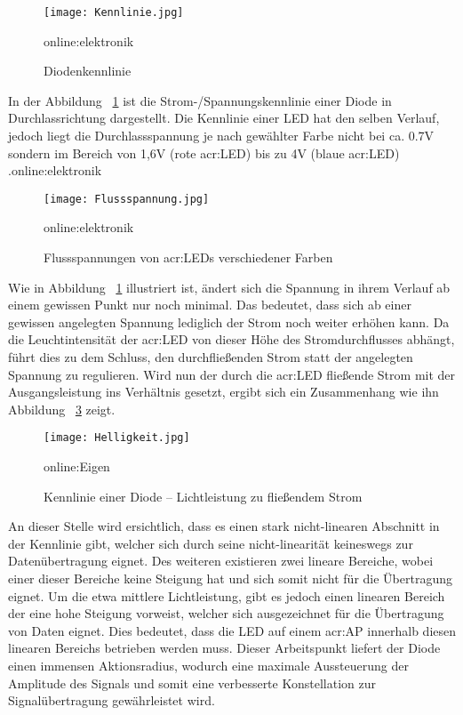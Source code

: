 \begin{figure}[H]
	\centering
	\texttt{[image: Kennlinie.jpg]}
	\caption[Diodenkennlinie]{Diodenkennlinie} 
	\gls{online:elektronik}
	\label{fig:Kennlinie}
\end{figure}

In der Abbildung ~\ref{fig:Kennlinie} ist die Strom-/Spannungskennlinie einer Diode in Durchlassrichtung
dargestellt. Die Kennlinie einer LED hat den selben Verlauf, jedoch liegt die Durchlassspannung je nach gewählter Farbe nicht bei ca. 0.7V sondern im Bereich von 1,6V (rote \gls{acr:LED}) bis zu 4V (blaue \gls{acr:LED}) .\gls{online:elektronik} 

\begin{figure}[H]
	\centering
	\texttt{[image: Flussspannung.jpg]}
	\caption[Flussspannungen von \gls{acr:LED}s verschiedener Farben]{Flussspannungen von \gls{acr:LED}s verschiedener Farben} 
	\gls{online:elektronik}
	\label{fig:Flussspannung}
\end{figure}

Wie in Abbildung ~\ref{fig:Kennlinie} illustriert ist, ändert sich die Spannung in ihrem Verlauf ab einem gewissen Punkt nur noch minimal. Das bedeutet, dass sich ab einer gewissen angelegten Spannung lediglich der Strom noch weiter erhöhen kann. Da die Leuchtintensität der \gls{acr:LED} von dieser Höhe des Stromdurchflusses abhängt, führt dies zu dem Schluss, den durchfließenden Strom statt der angelegten Spannung zu regulieren. Wird nun der durch die \gls{acr:LED} fließende Strom mit der Ausgangsleistung ins Verhältnis gesetzt, ergibt sich ein Zusammenhang wie ihn Abbildung ~\ref{fig:Helligkeit} zeigt. 

\begin{figure}[H]
	\centering
	\texttt{[image: Helligkeit.jpg]}
	\caption[Kennlinie einer Diode – Lichtleistung zu fließendem Strom]{Kennlinie einer Diode – Lichtleistung zu fließendem Strom} 
	\gls{online:Eigen}
	\label{fig:Helligkeit}
\end{figure}

An dieser Stelle wird ersichtlich, dass es einen stark nicht-linearen Abschnitt in der Kennlinie gibt, welcher sich durch seine nicht-linearität keineswegs zur Datenübertragung eignet. Des weiteren existieren zwei lineare Bereiche, wobei einer dieser Bereiche keine Steigung hat und sich somit nicht für die Übertragung eignet. Um die etwa mittlere Lichtleistung, gibt es jedoch einen linearen Bereich der eine hohe Steigung vorweist, welcher sich ausgezeichnet für die Übertragung von Daten eignet. Dies bedeutet, dass die LED auf einem  \gls{acr:AP} innerhalb diesen linearen Bereichs betrieben werden muss. Dieser Arbeitspunkt liefert der Diode einen immensen Aktionsradius, wodurch eine maximale Aussteuerung der Amplitude des Signals und somit eine verbesserte Konstellation zur Signalübertragung gewährleistet wird.\cite{vlc2}


